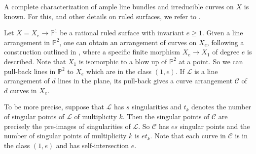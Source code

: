 \documentclass[12pt,reqno]{amsart}
\newcommand{\proj}{\mathbb{P}}
\theoremstyle{plain}
\numberwithin{equation}{section}
\theoremstyle{definition}
\begin{document}
	A complete characterization of ample line bundles and irreducible curves on $X$ is known. For this, and other details on ruled surfaces, we refer to \cite[Chapter V, Section 2]{Har}.

	Let $X = X_e \to \mathbb{P}^1$ be a rational ruled surface with invariant $e \ge 1$. 
	Given a line arrangement in $\proj^2$, one can obtain an arrangement of
	curves on $X_e$, following a construction outlined in \cite[Example
	15]{E}, where a specific finite morphism $X_e \to X_1$ of degree $e$ is described. Note
	that $X_1$ is isomorphic to a blow up of $\proj^2$ at a point. So we
	can pull-back lines in $\proj^2$ to $X_e$ which are in the class 
	$(1,e)$. If $\mathcal{L}$ is a line arrangement of $d$ lines in the plane, its
	pull-back gives a curve arrangement $\mathcal{C}$ of $d$ curves in
	$X_e$. 
	
	To be more precise, suppose that $\mathcal{L}$ has $s$ singularities 
	and $t_k$ denotes the number of singular points of $\mathcal{L}$ of
	multiplicity $k$. Then the singular points of $\mathcal{C}$ are
	precisely the pre-images of singularities of $\mathcal{L}$. So 
	$\mathcal{C}$  has $es$ singular points and the
	number of singular points of multiplicity $k$ is $et_k$. Note that
	each curve in $\mathcal{C}$ is in the class $(1,e)$ and has
	self-intersection $e$.
	
\end{document}
